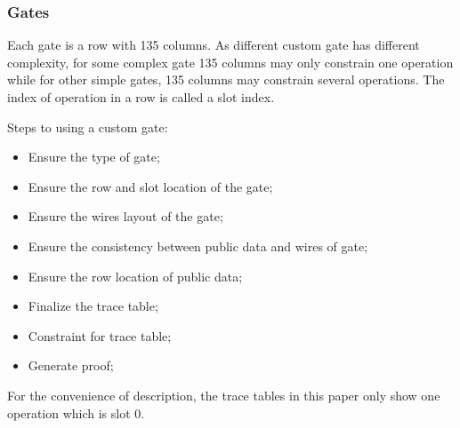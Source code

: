 \subsubsection{Gates} \label{sec:gates}

Each gate is a row with 135 columns. As different custom gate has different complexity, for some complex gate 135 columns may only constrain one
operation while for other simple gates, 135 columns may constrain several operations. The index of operation in a row is called a slot index.

Steps to using a custom gate:
\begin{itemize}
    \item Ensure the type of gate;
    \item Ensure the row and slot location of the gate;
    \item Ensure the wires layout of the gate;
    \item Ensure the consistency between public data and wires of gate;
    \item Ensure the row location of public data;\
    \item Finalize the trace table;
    \item Constraint for trace table;
    \item Generate proof;
\end{itemize}

For the convenience of description, the trace tables in this paper only show one operation which is slot 0.
\subsubsubsection{Custom gates}














